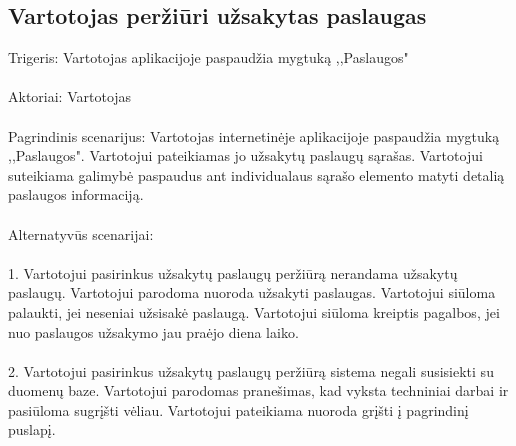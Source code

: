 \documentclass[oneside]{VUMIFPSkursinis}
\begin{document}
\subsection{Vartotojas peržiūri užsakytas paslaugas}
	Trigeris: Vartotojas aplikacijoje paspaudžia mygtuką ,,Paslaugos"\\ \\
	Aktoriai: Vartotojas\\ \\
	Pagrindinis scenarijus: Vartotojas internetinėje aplikacijoje paspaudžia mygtuką ,,Paslaugos". Vartotojui pateikiamas jo užsakytų paslaugų sąrašas. Vartotojui suteikiama galimybė paspaudus ant individualaus sąrašo elemento matyti detalią paslaugos informaciją.\\ \\
	Alternatyvūs scenarijai:\\ \\
1. Vartotojui pasirinkus užsakytų paslaugų peržiūrą nerandama užsakytų paslaugų. Vartotojui parodoma nuoroda užsakyti paslaugas. Vartotojui siūloma palaukti, jei neseniai užsisakė paslaugą. Vartotojui siūloma kreiptis pagalbos, jei nuo paslaugos užsakymo jau praėjo diena laiko.\\ \\
2. Vartotojui pasirinkus užsakytų paslaugų peržiūrą sistema negali susisiekti su duomenų baze. Vartotojui parodomas pranešimas, kad vyksta techniniai darbai ir pasiūloma sugrįšti vėliau. Vartotojui pateikiama nuoroda grįšti į pagrindinį puslapį.\\ \\
\end{document}
